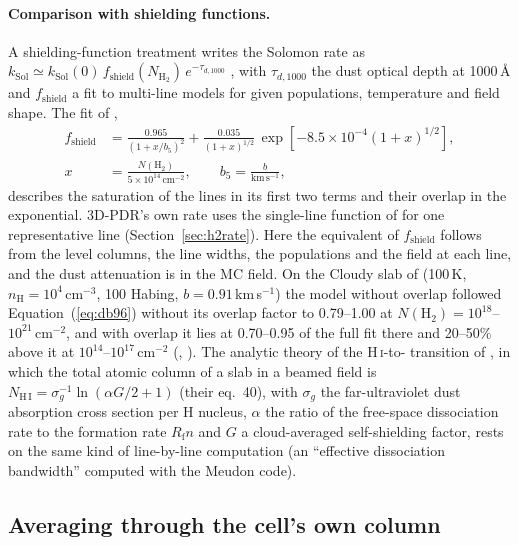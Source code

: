 \paragraph{Comparison with shielding functions.} A shielding-function
treatment writes the Solomon rate as $k_{\mathrm{Sol}}\simeq k_{\mathrm{Sol}}(0)\,
f_{\mathrm{shield}}(N_{\mathrm{H_2}})\,e^{-\tau_{d,1000}}$ \citep[their
eq.~40]{DraineBertoldi1996}, with $\tau_{d,1000}$ the dust optical depth at
1000\,\AA{} and $f_{\mathrm{shield}}$ a fit to multi-line models for given
populations, temperature and field shape. The fit of \citet[their
eq.~37]{DraineBertoldi1996},
\begin{equation}
  \begin{split}
  f_{\mathrm{shield}} &= \frac{0.965}{(1+x/b_5)^2}+\frac{0.035}{(1+x)^{1/2}}\,
     \exp\!\left[-8.5\times10^{-4}(1+x)^{1/2}\right],\\
  x&=\frac{N(\mathrm{H_2})}{5\times10^{14}\,\mathrm{cm^{-2}}},\qquad b_5=\frac{b}{\mathrm{km\,s^{-1}}},
  \end{split}
  \label{eq:db96}
\end{equation}
describes the saturation of the lines in its first two terms and their
overlap in the exponential. 3D-PDR's own rate uses the single-line function of
\citet{Federman1979} for one representative line
(Section~\ref{sec:h2rate}). Here the equivalent of $f_{\mathrm{shield}}$
follows from the level columns, the line widths, the populations and the
field at each line, and the dust attenuation is in the MC field. On the Cloudy
slab of  (100\,K, $n_{\mathrm H}=10^4$\,cm$^{-3}$, 100 Habing,
$b=0.91$\,km\,s$^{-1}$) the model without overlap followed Equation~(\ref{eq:db96})
without its overlap factor to 0.79--1.00 at $N(\mathrm{H_2})=10^{18}$--$10^{21}$\,cm$^{-2}$,
and with overlap it lies at 0.70--0.95 of the full fit there and 20--50\% above
it at $10^{14}$--$10^{17}$\,cm$^{-2}$ (, ). The analytic
theory of the H\,\textsc{i}-to-\Htwo{} transition of \citet{Sternberg2014}, in
which the total atomic column of a slab in a beamed field is
$N_{\mathrm{H\,I}}=\sigma_g^{-1}\ln(\alpha G/2+1)$ (their eq.~40), with $\sigma_g$ the
far-ultraviolet dust absorption cross section per H nucleus, $\alpha$ the ratio
of the free-space dissociation rate to the formation rate $R_{\mathrm f}n$ and $G$ a
cloud-averaged self-shielding factor, rests on the same kind of line-by-line
computation (an ``effective dissociation bandwidth'' computed with the Meudon
code).

\subsection{Averaging through the cell's own column}
\label{sec:ownavg}

